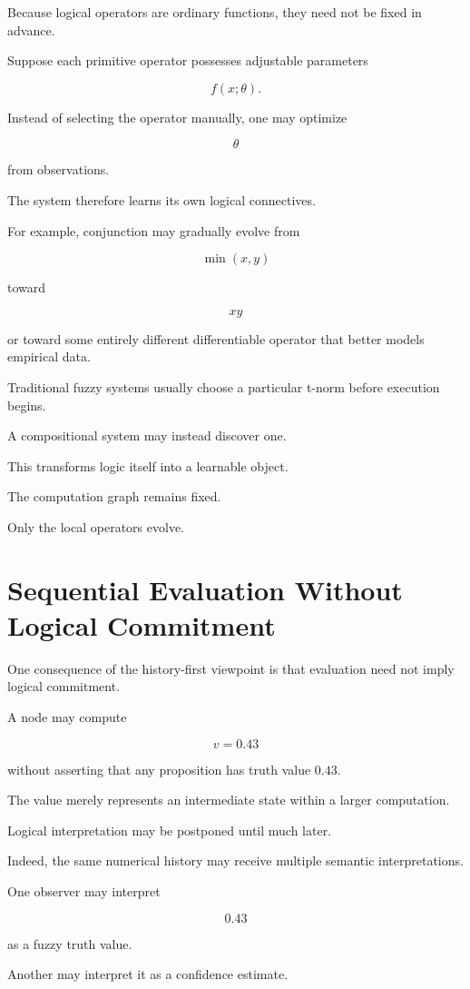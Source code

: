 \documentclass[12pt,oneside]{article}
\begin{document}
Because logical operators are ordinary functions, they need not be fixed in advance.

Suppose each primitive operator possesses adjustable parameters

\[
f(x;\theta).
\]

Instead of selecting the operator manually, one may optimize

\[
\theta
\]

from observations.

The system therefore learns its own logical connectives.

For example, conjunction may gradually evolve from

\[
\min(x,y)
\]

toward

\[
xy
\]

or toward some entirely different differentiable operator that better models empirical data.

Traditional fuzzy systems usually choose a particular t-norm before execution begins.

A compositional system may instead discover one.

This transforms logic itself into a learnable object.

The computation graph remains fixed.

Only the local operators evolve.

\section{Sequential Evaluation Without Logical Commitment}

One consequence of the history-first viewpoint is that evaluation need not imply logical commitment.

A node may compute

\[
v=0.43
\]

without asserting that any proposition has truth value $0.43$.

The value merely represents an intermediate state within a larger computation.

Logical interpretation may be postponed until much later.

Indeed, the same numerical history may receive multiple semantic interpretations.

One observer may interpret

\[
0.43
\]

as a fuzzy truth value.

Another may interpret it as a confidence estimate.
\end{document}
